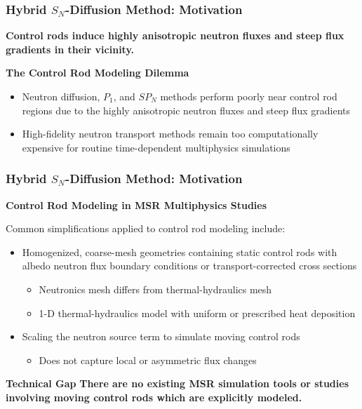 \begin{frame}
  \frametitle{Hybrid $S_N$-Diffusion Method: Motivation}
  \textbf{Control rods induce highly anisotropic neutron fluxes and steep flux gradients in their
  vicinity.}
  \begin{block}{\textbf{The Control Rod Modeling Dilemma}}
    \begin{itemize}
      \item Neutron diffusion, $P_1$, and $SP_N$ methods perform poorly near control rod regions
        due to the highly anisotropic neutron fluxes and steep flux gradients
      \item High-fidelity neutron transport methods remain too computationally expensive for
        routine time-dependent multiphysics simulations
    \end{itemize}
  \end{block}
\end{frame}

\begin{frame}
  \frametitle{Hybrid $S_N$-Diffusion Method: Motivation}
  \textbf{Control Rod Modeling in MSR Multiphysics Studies}
  \vspace{.2cm}

  Common simplifications applied to control rod modeling include:
  \begin{itemize}
    \item Homogenized, coarse-mesh geometries containing static control rods with albedo neutron
      flux boundary conditions \cite{kophazi_development_2009} or transport-corrected cross
      sections \cite{cui_development_2021, jaradat_development_2021, yang_development_2022}
      \begin{itemize}
        \item Neutronics mesh differs from thermal-hydraulics mesh
        \item 1-D thermal-hydraulics model with uniform or prescribed heat deposition
      \end{itemize}
    \item Scaling the neutron source term to simulate moving control rods
      \cite{delpech_benchmark_2003, krepel_dyn3d-msr_2007, jaradat_development_2021,
      yang_development_2022}
      \begin{itemize}
        \item Does not capture local or asymmetric flux changes
      \end{itemize}
  \end{itemize}

  \begin{block}{\textbf{Technical Gap}}
    \textbf{There are no existing MSR simulation tools or studies involving moving control rods
    which are explicitly modeled.}
  \end{block}
\end{frame}
